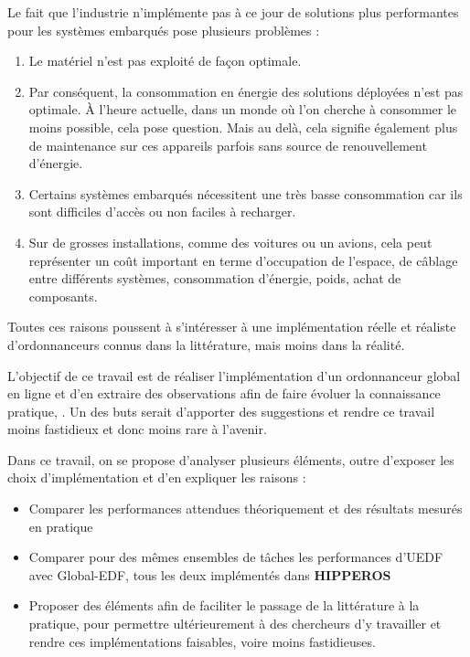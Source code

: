 	Le fait que l'industrie n'implémente pas à ce jour de solutions plus \og performantes \fg{} 
	pour les systèmes embarqués pose plusieurs problèmes :
	\begin{enumerate}
		\item Le matériel n'est pas exploité de façon optimale.
		\item Par conséquent, la consommation en énergie des solutions déployées n'est 
		pas optimale.
		À l'heure actuelle, dans un monde où l'on cherche à consommer le moins possible, 
		cela pose question. Mais au delà, cela signifie également plus de maintenance 
		sur ces appareils parfois sans source de renouvellement d'énergie.
		\item Certains systèmes embarqués nécessitent une très basse consommation car 
		ils sont difficiles d'accès ou non faciles à recharger.
		\item Sur de grosses installations, comme des voitures ou un avions, cela peut représenter 
		un coût important en terme d'occupation de l'espace, de câblage entre différents systèmes, 
		consommation d'énergie, poids, achat de composants.
	\end{enumerate}
	
	Toutes ces raisons poussent à s'intéresser à une implémentation réelle et réaliste 
	d'ordonnanceurs connus dans la littérature, mais moins dans la réalité. \newline
	
	L'objectif de ce travail est de réaliser l'implémentation d'un ordonnanceur global en ligne 
	et d'en extraire des observations afin de faire évoluer la connaissance pratique, . 
	Un des buts serait d'apporter des suggestions et rendre ce travail moins fastidieux et 
	donc moins rare à l'avenir.
	
	Dans ce travail, on se propose d’analyser plusieurs éléments, outre d’exposer les choix d’implémentation et d’en expliquer les raisons : \medskip
	\begin{itemize}
		\item Comparer les performances attendues théoriquement et des résultats mesurés en pratique
		\item Comparer pour des mêmes ensembles de tâches les performances d’UEDF avec Global-EDF, tous les deux implémentés
		dans \textbf{HIPPEROS}
		\item Proposer des éléments afin de faciliter le passage de la littérature à la pratique, pour permettre
		ultérieurement à des chercheurs d'y travailler et rendre ces implémentations 
		faisables, voire moins fastidieuses.
	\end{itemize}
	